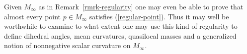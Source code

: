\documentclass[12pt]{amsart}
\begin{document}
Given $M_\infty$ as in Remark~\ref{rmrk-regularity}
one may even be able to prove that almost every point $p\in M_\infty$
satisfies (\ref{regular-point}).   Thus it may well be worthwhile to examine
to what extent one may use this kind of regularity to define dihedral angles,
mean curvatures, quasilocal masses and
a generalized notion of nonnegative scalar curvature on $M_\infty$.  



\end{document}
